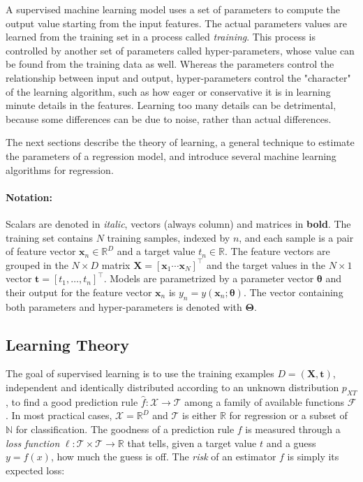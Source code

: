 \documentclass[12pt]{book}
\begin{document}
A supervised machine learning model uses a set of parameters to compute the output value starting from the input features. The actual parameters values are learned from the training set in a process called \emph{training}. This process is controlled by another set of parameters called hyper-parameters, whose value can be found from the training data as well. Whereas the parameters control the relationship between input and output, hyper-parameters control the "character" of the learning algorithm, such as how eager or conservative it is in learning minute details in the features. Learning too many details can be detrimental, because some differences can be due to noise, rather than actual differences.

The next sections describe the theory of learning, a general technique to estimate the parameters of a regression model, and introduce several machine learning algorithms for regression.

\paragraph{Notation:} Scalars are denoted in \textit{italic}, vectors (always column) and matrices in \textbf{bold}. The training set contains $N$ training samples, indexed by $n$, and each sample is a pair of feature vector $\bm x_n\in\mathbb{R}^D$ and a target value $t_n\in\mathbb{R}$. The feature vectors are grouped in the $N\times D$ matrix $\bm X=\left[\bm x_1\dotsb\bm x_N\right]^\intercal$ and the target values in the $N\times 1$ vector $\bm t=\left[t_1,\ldots,t_n\right]^\intercal$. Models are parametrized by a parameter vector $\bm\theta$ and their output for the feature vector $\bm x_n$ is $y_n=y(\bm x_n;\bm\theta)$. The vector containing both parameters and hyper-parameters is denoted with $\bm\Theta$.

\subsection{Learning Theory}
The goal of supervised learning is to use the training examples $D=(\bm X, \bm t)$, independent and identically distributed according to an unknown distribution $p_{XT}$, to find a good prediction rule $\hat{f}:\mathcal{X}\rightarrow\mathcal{T}$ among a family of available functions $\mathcal{F}$. In most practical cases, $\mathcal{X}=\mathbb{R}^D$ and $\mathcal{T}$ is either $\mathbb{R}$ for regression or a subset of $\mathbb{N}$ for classification. The goodness of a prediction rule $f$ is measured through a \emph{loss function} $\ell:\mathcal{T}\times\mathcal{T}\rightarrow\mathbb{R}$ that tells, given a target value $t$ and a guess $y=f(x)$, how much the guess is off. The \emph{risk} of an estimator $f$ is simply its expected loss:
\end{document}
